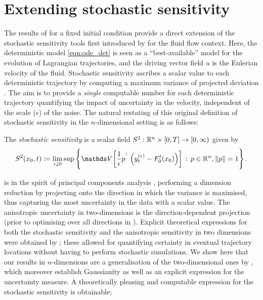 \section{Extending stochastic sensitivity}\label{sec:theory_s2}
The results of  for a fixed initial condition provide a direct extension of the stochastic sensitivity tools first introduced by \citet{Balasuriya_2020_StochasticSensitivityComputable} for the fluid flow context.
Here, the deterministic model \cref{eqn:ode_det} is seen as a ``best-available'' model for the evolution of Lagrangian trajectories, and the driving vector field \(u\) is the Eulerian velocity of the fluid.
Stochastic sensitivity ascribes a scalar value to each deterministic trajectory by computing a maximum variance of projected deviation \citep{Balasuriya_2020_StochasticSensitivityComputable}.
The aim is to provide a \emph{single} computable number for each deterministic trajectory quantifying the impact of uncertainty in the velocity, independent of the scale (\(\epsilon\)) of the noise.
The natural restating of this original definition of stochastic sensitivity \citep{Balasuriya_2020_StochasticSensitivityComputable} in the $ n $-dimensional setting is as follows:

\begin{definition}\label{def:ss_Rn}
	The \emph{stochastic sensitivity} is a scalar field \(S^2: \mathbb{R}^n \times [0,T] \to \left[0, \infty\right)\) given by
	\begin{equation*}
		S^2\!\left(x_0,t\right) \coloneqq \lim_{\epsilon\downarrow 0}\sup\set{\var{\frac{1}{\epsilon}p^{\T}\left(y_t^{(\epsilon)} - F_0^t\!\left(x_0\right)\right)} \,: \, p \in \R^n, \, \norm{p} = 1}.
	\end{equation*}
\end{definition}

 is in the spirit of principal components analysis \citep{Jolliffe_2002_PrincipalComponentAnalysis}, performing a dimension reduction by projecting onto the direction in which the variance is maximised, thus capturing the most uncertainty in the data with a scalar value.
The anisotropic uncertainty in two-dimensions \citep{Balasuriya_2020_StochasticSensitivityComputable} is the direction-dependent projection (prior to optimising over all directions in ).
Explicit theoretical expressions for both the stochastic sensitivity and the anisotropic sensitivity in two dimensions were obtained by \citet{Balasuriya_2020_StochasticSensitivityComputable}; these allowed for quantifying certainty in eventual trajectory locations without having to perform stochastic simulations.
We show here that our results in \(n\)-dimensions are a generalisation of the two-dimensional ones by \citet{Balasuriya_2020_StochasticSensitivityComputable}, which moreover establish Gaussianity as well as an explicit expression for the uncertainty measure.
A theoretically pleasing and computable expression for the stochastic sensitivity is obtainable;


